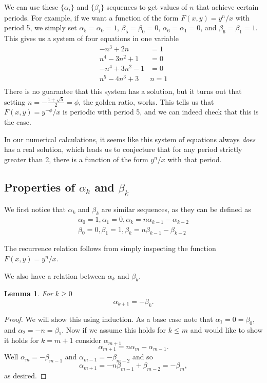 \documentclass[12pt]{article}
\newtheorem{lemma}{Lemma}
\begin{document}
We can use these $\{\alpha_i\}$ and $\{\beta_i\}$ sequences to get values of $n$ that achieve certain periods. For example, if we want a function of the form $F(x,y) = y^n/x$ with period 5, we simply set $\alpha_5 = \alpha_0 = 1$, $\beta_5 = \beta_0 = 0$, $\alpha_6 = \alpha_1 = 0$, and $\beta_6 = \beta_1 = 1$. This gives us a system of four equations in one variable
\begin{align*}
-n^3+2n &= 1\\
n^4-3n^2+1&=0\\
-n^4+3n^2 -1&= 0\\
n^5-4n^3+3&n=1\\
\end{align*}
There is no guarantee that this system has a solution, but it turns out that setting $n = -\frac{1+\sqrt{5}}{2} = \phi$, the golden ratio, works. This tells us that $F(x,y) = y^{-\phi}/x$ is periodic with period 5, and we can indeed check that this is the case.

In our numerical calculations, it seems like this system of equations always \emph{does} has a real solution, which leads us to conjecture that for any period strictly greater than 2, there is a function of the form $y^n/x$ with that period.

\subsection{Properties of $\alpha_k$ and $\beta_k$}

We first notice that $\alpha_k$ and $\beta_k$ are similar sequences, as they can be defined as
\begin{align*}
\alpha_0 = 1, \alpha_1 = 0, \alpha_k = n\alpha_{k-1} - \alpha_{k-2}\\
\beta_0 = 0, \beta_1 = 1, \beta_k = n\beta_{k-1} - \beta_{k-2}
\end{align*}

The recurrence relation follows from simply inspecting the function $F(x,y) = y^n/x$.

We also have a relation between $\alpha_k$ and $\beta_k$. 
\begin{lemma} 
\label{ab} For $k\geq 0$
\begin{equation*}
\alpha_{k+1} = - \beta_{k}.
\end{equation*}
\end{lemma}
\begin{proof}
We will show this using induction. As a base case note that $\alpha_1 = 0 = \beta_0$, and $\alpha_2 = -n = \beta_1$. Now if we assume this holds for $k \leq m$ and would like to show it holds for $k = m+1$ consider $\alpha_{m+1}$
\begin{equation*}
\alpha_{m+1} = n \alpha_{m} - \alpha_{m-1}.
\end{equation*}
Well $\alpha_m = -\beta_{m-1}$ and $\alpha_{m-1} = - \beta_{m-2}$ and so 
\begin{equation*}
\alpha_{m+1} = - n \beta_{m-1} + \beta_{m-2} = -\beta_{m},
\end{equation*}
as desired.
\end{proof}
\end{document}
